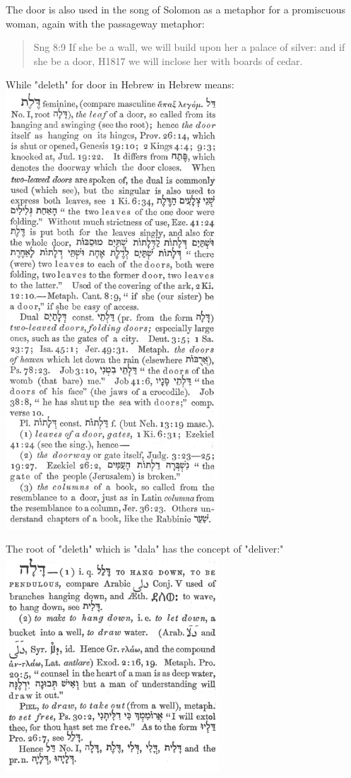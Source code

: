 \documentclass[11pt]{article}
\begin{document}
The door is also used in the song of Solomon as a metaphor for a promiscuous woman, again with the passageway metaphor:
\begin{quote}
Sng 8:9
If she be a wall, we will build upon her a palace of silver: and if she be a door, H1817 we will inclose her with boards of cedar.
\end{quote}
While "deleth" for door in Hebrew in Hebrew means:  \newline
\includegraphics[width=8cm]{deleth_h1817}

The root of "deleth" which is "dala" has the concept of "deliver:" \newline
\includegraphics[width=8cm]{dala_h1802} \newline
\end{document}
